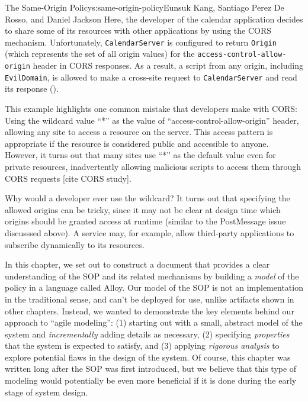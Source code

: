 \begin{aosachapter}{The Same-Origin Policy}{s:same-origin-policy}{Eunsuk Kang, Santiago Perez De Rosso, and Daniel Jackson}
Here, the developer of the calendar application decides to share some of
its resources with other applications by using the CORS mechanism.
Unfortunately, \texttt{CalendarServer} is configured to return
\texttt{Origin} (which represents the set of all origin values) for the
\texttt{access-control-allow-origin} header in CORS responses. As a
result, a script from any origin, including \texttt{EvilDomain}, is
allowed to make a cross-site request to \texttt{CalendarServer} and read
its response ().


This example highlights one common mistake that developers make with
CORS: Using the wildcard value ``*'' as the value of
``access-control-allow-origin'' header, allowing any site to access a
resource on the server. This access pattern is appropriate if the
resource is considered public and accessible to anyone. However, it
turns out that many sites use ``*'' as the default value even for
private resources, inadvertently allowing malicious scripts to access
them through CORS requests {[}cite CORS study{]}.

Why would a developer ever use the wildcard? It turns out that
specifying the allowed origins can be tricky, since it may not be clear
at design time which origins should be granted access at runtime
(similar to the PostMessage issue discusssed above). A service may, for
example, allow third-party applications to subscribe dynamically to its
resources.

\label{conclusion}

In this chapter, we set out to construct a document that provides a
clear understanding of the SOP and its related mechanisms by building a
\emph{model} of the policy in a language called Alloy. Our model of the
SOP is not an implementation in the traditional sense, and can't be
deployed for use, unlike artifacts shown in other chapters. Instead, we
wanted to demonstrate the key elements behind our approach to ``agile
modeling'': (1) starting out with a small, abstract model of the system
and \emph{incrementally} adding details as necessary, (2) specifying
\emph{properties} that the system is expected to satisfy, and (3)
applying \emph{rigorous analysis} to explore potential flaws in the
design of the system. Of course, this chapter was written long after the
SOP was first introduced, but we believe that this type of modeling
would potentially be even more beneficial if it is done during the early
stage of system design.


\end{aosachapter}
